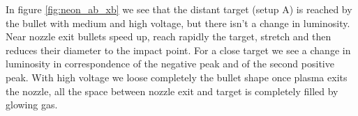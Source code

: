 In figure \ref{fig:neon_ab_xb} we see that the distant target (setup A) is reached by the bullet with medium and high voltage, but there isn't a change in luminosity. Near nozzle exit bullets speed up, reach rapidly the target, stretch and then reduces their diameter to the impact point.
For a close target we see a change in luminosity in correspondence of the negative peak and of the second positive peak. With high voltage we loose completely the bullet shape once plasma exits the nozzle, all the space between nozzle exit and target is completely filled by glowing gas.
\begin{figure}
 \centering
 \hfill
 
 \hfill
 

\end{figure}
